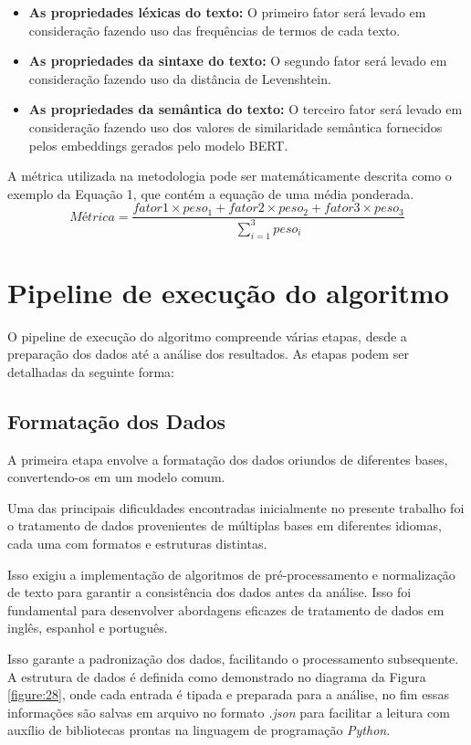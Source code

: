\begin{itemize} 
  \item \textbf{As propriedades léxicas do texto:} O primeiro fator será levado em consideração fazendo uso das frequências de termos de cada texto. 
  \item \textbf{As propriedades da sintaxe do texto:} O segundo fator será levado em consideração fazendo uso da distância de Levenshtein. 
  \item \textbf{As propriedades da semântica do texto:} O terceiro fator será levado em consideração fazendo uso dos valores de similaridade semântica fornecidos pelos embeddings gerados pelo modelo BERT. 
\end{itemize}

A métrica utilizada na metodologia pode ser matemáticamente descrita como o exemplo da Equação 1, que contém a equação de uma média ponderada.
\begin{equation}
Métrica = \frac{fator1 \times peso_{1} + fator2 \times peso_{2} + fator3 \times peso_{3}}{\sum_{i=1}^{3}peso_{i}}
\label{eq:1}
\end{equation}

\section{Pipeline de execução do algoritmo}

O pipeline de execução do algoritmo compreende várias etapas, desde a preparação dos dados até a análise dos resultados. As etapas podem ser detalhadas da seguinte forma:

\subsection{Formatação dos Dados}

A primeira etapa envolve a formatação dos dados oriundos de diferentes bases, convertendo-os em um modelo comum. 

Uma das principais dificuldades encontradas inicialmente no presente trabalho foi o tratamento de dados provenientes de múltiplas bases em diferentes idiomas, cada uma com formatos e estruturas distintas. 

Isso exigiu a implementação de algoritmos de pré-processamento e normalização de texto para garantir a consistência dos dados antes da análise. Isso foi fundamental para desenvolver abordagens eficazes de tratamento de dados em inglês, espanhol e português.

Isso garante a padronização dos dados, facilitando o processamento subsequente. A estrutura de dados é definida como demonstrado no diagrama da Figura \ref{figure:28}, onde cada entrada é tipada e preparada para a análise, no fim essas informações são salvas em arquivo no formato \textit{.json} para facilitar a leitura com auxílio de bibliotecas prontas na linguagem de programação \textit{Python}.

